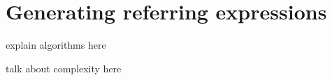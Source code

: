 \section{Generating referring expressions} \label{sec:gre}

explain algorithms here

talk about complexity here

